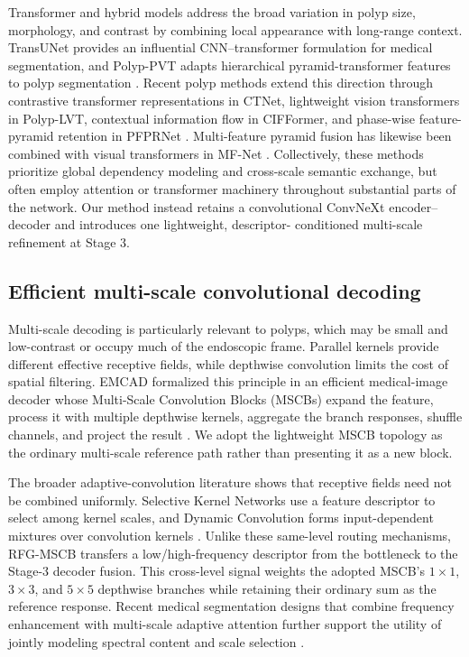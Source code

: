 Transformer and hybrid models address the broad variation in polyp size, morphology,
and contrast by combining local appearance with long-range context. TransUNet provides
an influential CNN--transformer formulation for medical segmentation, and Polyp-PVT
adapts hierarchical pyramid-transformer features to polyp segmentation
\cite{transunet,polyppvt}. Recent polyp methods extend this direction through
contrastive transformer representations in CTNet, lightweight vision transformers in
Polyp-LVT, contextual information flow in CIFFormer, and phase-wise feature-pyramid
retention in PFPRNet \cite{ctnet,polyplvt,cifformer,pfprnet}. Multi-feature pyramid
fusion has likewise been combined with visual transformers in MF-Net
\cite{mfnet}. Collectively, these methods prioritize global dependency modeling and
cross-scale semantic exchange, but often employ attention or transformer machinery
throughout substantial parts of the network. Our method instead retains a
convolutional ConvNeXt encoder--decoder and introduces one lightweight, descriptor-
conditioned multi-scale refinement at Stage 3.

\subsection{Efficient multi-scale convolutional decoding}

Multi-scale decoding is particularly relevant to polyps, which may be small and
low-contrast or occupy much of the endoscopic frame. Parallel kernels provide
different effective receptive fields, while depthwise convolution limits the cost of
spatial filtering. EMCAD formalized this principle in an efficient medical-image
decoder whose Multi-Scale Convolution Blocks (MSCBs) expand the feature, process it
with multiple depthwise kernels, aggregate the branch responses, shuffle channels,
and project the result \cite{emcad}. We adopt the lightweight MSCB topology as the
ordinary multi-scale reference path rather than presenting it as a new block.

The broader adaptive-convolution literature shows that receptive fields need not be
combined uniformly. Selective Kernel Networks use a feature descriptor to select
among kernel scales, and Dynamic Convolution forms input-dependent mixtures over
convolution kernels \cite{sknet,dynamicconv}. Unlike these same-level routing
mechanisms, RFG-MSCB transfers a low/high-frequency descriptor from the bottleneck to
the Stage-3 decoder fusion. This cross-level signal weights the adopted MSCB's
$1\times1$, $3\times3$, and $5\times5$ depthwise branches while retaining their
ordinary sum as the reference response. Recent medical segmentation designs that
combine frequency enhancement with multi-scale adaptive attention further support the
utility of jointly modeling spectral content and scale selection \cite{femaanet}.

